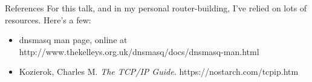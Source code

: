 \documentclass[bigger,aspectratio=169]{beamer}
\begin{document}
\begin{frame}{References}
  For this talk, and in my personal router-building, I've relied on lots of
  resources. Here's a few:
  \begin{itemize}
  \item dnsmasq man page, online at http://www.thekelleys.org.uk/dnsmasq/docs/dnsmasq-man.html
  \item Kozierok, Charles M. \textit{The TCP/IP Guide.} https://nostarch.com/tcpip.htm
  \end{itemize}
\end{frame}
\end{document}
